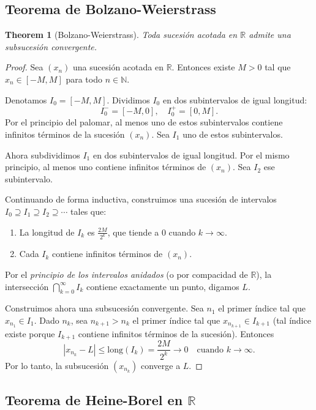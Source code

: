 \documentclass[11pt,a4paper]{article}
\theoremstyle{plain}
\newtheorem{theorem}{Theorem}[section]
\theoremstyle{definition}
\begin{document}
\subsection{Teorema de Bolzano-Weierstrass}

\begin{theorem}[Bolzano-Weierstrass]
Toda sucesión acotada en $\mathbb{R}$ admite una subsucesión convergente.
\end{theorem}

\begin{proof}
Sea $(x_n)$ una sucesión acotada en $\mathbb{R}$. Entonces existe $M > 0$ tal que $x_n \in [-M, M]$ para todo $n \in \mathbb{N}$.

\medskip
Denotamos $I_0 = [-M, M]$. Dividimos $I_0$ en dos subintervalos de igual longitud:
\[
I_0^- = \left[-M, 0\right], \quad I_0^+ = \left[0, M\right].
\]
Por el principio del palomar, al menos uno de estos subintervalos contiene infinitos términos de la sucesión $(x_n)$. Sea $I_1$ uno de estos subintervalos.

\medskip
Ahora subdividimos $I_1$ en dos subintervalos de igual longitud. Por el mismo principio, al menos uno contiene infinitos términos de $(x_n)$. Sea $I_2$ ese subintervalo.

\medskip
Continuando de forma inductiva, construimos una sucesión de intervalos $I_0 \supseteq I_1 \supseteq I_2 \supseteq \cdots$ tales que:
\begin{enumerate}
    \item La longitud de $I_k$ es $\frac{2M}{2^k}$, que tiende a $0$ cuando $k \to \infty$.
    \item Cada $I_k$ contiene infinitos términos de $(x_n)$.
\end{enumerate}

\medskip
Por el \emph{principio de los intervalos anidados} (o por compacidad de $\mathbb{R}$), la intersección $\bigcap_{k=0}^{\infty} I_k$ contiene exactamente un punto, digamos $L$.

\medskip
Construimos ahora una subsucesión convergente. Sea $n_1$ el primer índice tal que $x_{n_1} \in I_1$. Dado $n_k$, sea $n_{k+1} > n_k$ el primer índice tal que $x_{n_{k+1}} \in I_{k+1}$ (tal índice existe porque $I_{k+1}$ contiene infinitos términos de la sucesión). Entonces
\[
|x_{n_k} - L| \leq \text{long}(I_k) = \frac{2M}{2^k} \to 0 \quad \text{cuando } k \to \infty.
\]
Por lo tanto, la subsucesión $(x_{n_k})$ converge a $L$.
\end{proof}

\subsection{Teorema de Heine-Borel en $\mathbb{R}$}
\end{document}
